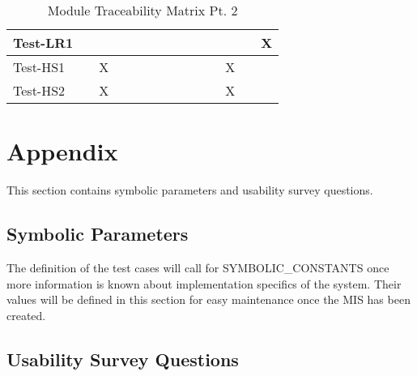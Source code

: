 \documentclass[12pt, titlepage]{article}
\begin{document}
\begin{table}[H]
\begin{adjustwidth}{-0.3in}{-0.5in}
{\begin{tabular}{c|c|c|c|c|c|c|c|c|c|c|c|c|c|}
\multicolumn{1}{|l|}{{Test-LR1}}   &             &             &             &             &             &             &             &             &              &              &                           &  & X                   \\ \hline
\multicolumn{1}{|l|}{{Test-HS1}}   &             &          X   &             &             &             &             &             &             &              &              &                           X&  &                    \\ \hline
\multicolumn{1}{|l|}{{Test-HS2}}   &             &          X   &             &             &             &             &             &             &              &              &                           X&  &                    \\ \hline
\end{tabular}}
\caption{Module Traceability Matrix Pt. 2}
    \label{tab:matrix5}
\end{adjustwidth}
\end{table}

				



\newpage

\section{Appendix}

This section contains symbolic parameters and usability survey questions.

\subsection{Symbolic Parameters}

The definition of the test cases will call for SYMBOLIC\_CONSTANTS once more information is known about implementation specifics of the system.
Their values will be defined in this section for easy maintenance once the MIS has been created.

\subsection{Usability Survey Questions} \label{subsec:UsabilitySurvey}
\end{document}
